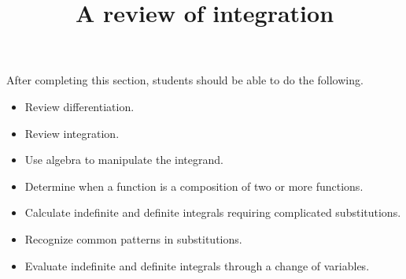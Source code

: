 \documentclass{ximera}
\title{A review of integration}
\begin{document}
\begin{abstract}
\end{abstract}

\maketitle

\begin{sectionOutcomes}

After completing this section, students should be able to do the following.

\begin{itemize}
\item Review differentiation.
\item Review integration.
\item Use algebra to manipulate the integrand.
\item Determine when a function is a composition of two or more functions.
\item Calculate indefinite and definite integrals requiring complicated substitutions.
\item Recognize common patterns in substitutions.
\item Evaluate indefinite and definite integrals through a change of variables.
\end{itemize}

\end{sectionOutcomes}
\end{document}
